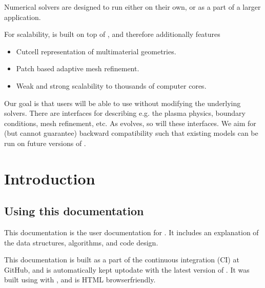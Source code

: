 \documentclass[letterpaper,10pt,english]{sphinxmanual}
\begin{document}
Numerical solvers are designed to run either on their own, or as a part of a larger application.

For scalability,  is built on top of , and therefore additionally features
\begin{itemize}
\item {} 
Cut\sphinxhyphen{}cell representation of multi\sphinxhyphen{}material geometries.

\item {} 
Patch based adaptive mesh refinement.

\item {} 
Weak and strong scalability to thousands of computer cores.

\end{itemize}

Our goal is that users will be able to use  without modifying the underlying solvers.
There are interfaces for describing e.g. the plasma physics, boundary conditions, mesh refinement, etc.
As  evolves, so will these interfaces.
We aim for (but cannot guarantee) backward compatibility such that existing  models can be run on future versions of .




\chapter{Introduction}
\label{\detokenize{index:introduction}}

\section{Using this documentation}
\label{\detokenize{Base/Documentation:using-this-documentation}}\label{\detokenize{Base/Documentation::doc}}
This documentation is the user documentation for .
It includes an explanation of the data structures, algorithms, and code design.

This documentation is built as a part of the continuous integration (CI) at GitHub, and is automatically kept up\sphinxhyphen{}to\sphinxhyphen{}date with the latest version of .
It was built using  with , and is HTML browser\sphinxhyphen{}friendly.
\end{document}

